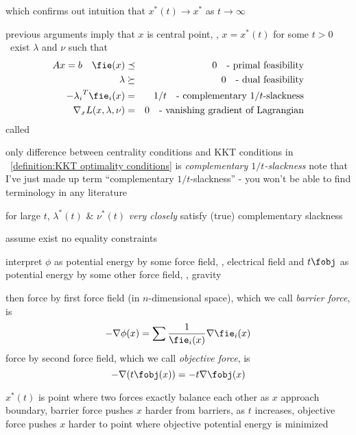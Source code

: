 \documentclass[17pt,landscape]{foils}
\begin{document}
{\vitem []
	which
	confirms out intuition that $x^\ast(t)\to x^\ast$ as $t\to\infty$
\eit
\vfill



\bit
\item
	previous arguments imply that $x$ is central point,
	\ie, $x=x^\ast(t)$ for some $t>0$
	\iaoi\
	exist $\lambda$ and $\nu$ such that
	\begin{eqnarray*}
		Ax=b
		\quad
		\fie({x})
			&\preceq&
		0
		\quad
		\mbox{- primal feasibility}
		\\
		\lambda
			&\succeq&
		0
		\quad
		\mbox{- dual feasibility}
		\\
		- {\lambda_i}^T \fie_i({x})
			&=&
		1/t
		\quad
		\mbox{- complementary $1/t$-slackness}
		\\
		\nabla_x L(x,\lambda,\nu)
			&=&
		0
		\quad
		\mbox{- vanishing gradient of Lagrangian}
	\end{eqnarray*}
	called 

\vitem
	only difference between centrality conditions and KKT conditions in ~\ref{definition:KKT optimality conditions}
	is \emph{complementary $1/t$-slackness}
	\bit
	\vitem
		note that I've just made up term ``complementary $1/t$-slackness''
		- you won't be able to find terminology in any literature
	\eit

\vitem
	for large $t$, $\lambda^\ast(t)$ \& $\nu^\ast(t)$ \emph{very closely} satisfy (true) complementary slackness
\eit
\vfill



\bit
\item
	assume exist no equality constraints

\vitem
	interpret $\phi$ as potential energy by some force field, \eg, electrical field
	and $t\fobj$ as potential energy by some other force field, \eg, gravity

\vitem
	then
	\bit
	\vitem
		force by first force field (in $n$-dimensional space), which we call \emph{barrier force}, is
		$$
			- \nabla \phi(x) = \sum \frac{1}{\fie_i(x)} \nabla \fie_i(x)
		$$
	\vitem
		force by second force field, which we call \emph{objective force}, is
		$$
			- \nabla (t\fobj(x)) = -t \nabla \fobj(x)
		$$
	\eit

\vitem
	$x^\ast(t)$ is point where two forces exactly balance each other
	\bit
	\vitem
		as $x$ approach boundary, barrier force pushes $x$ harder from barriers,
	\vitem
		as $t$ increases, objective force pushes $x$ harder to point where objective potential energy is minimized
	\eit
\eit
\vfill


}
\end{document}
